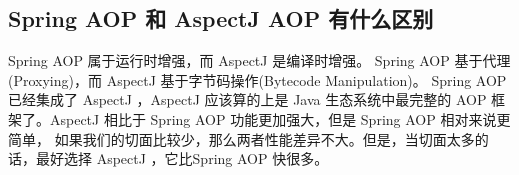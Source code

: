 \documentclass[../../../interview-questions.tex]{subfiles}
\begin{document}
\subsection{Spring AOP 和 AspectJ AOP 有什么区别}

Spring AOP 属于运行时增强，而 AspectJ 是编译时增强。 Spring AOP 基于代理(Proxying)，而 AspectJ 基于字节码操作(Bytecode Manipulation)。
Spring AOP 已经集成了 AspectJ  ，AspectJ  应该算的上是 Java 生态系统中最完整的 AOP 框架了。AspectJ  相比于 Spring AOP 功能更加强大，但是 Spring AOP 相对来说更简单，
如果我们的切面比较少，那么两者性能差异不大。但是，当切面太多的话，最好选择 AspectJ ，它比Spring AOP 快很多。
\end{document}
